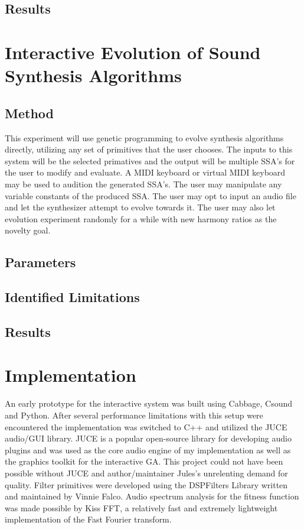 \documentclass[12pt]{article}
\begin{document}
\subsection{Results}

\section{Interactive Evolution of Sound Synthesis Algorithms}
\subsection{Method}
This experiment will use genetic programming to evolve synthesis algorithms directly, utilizing any set of primitives that the user chooses. The inputs to this system will be the selected primatives and the output will be multiple SSA's for the user to modify and evaluate. A MIDI keyboard or virtual MIDI keyboard may be used to audition the generated SSA's. The user may manipulate any variable constants of the produced SSA. The user may opt to input an audio file and let the synthesizer attempt to evolve towards it. The user may also let evolution experiment randomly for a while with new harmony ratios as the novelty goal.
\subsection{Parameters}
\subsection{Identified Limitations}
\subsection{Results}

\section{Implementation}
An early prototype for the interactive system was built using Cabbage, Csound and Python. After several performance limitations with this setup were encountered the implementation was switched to C++ and utilized the JUCE audio/GUI library. JUCE is a popular open-source library for developing audio plugins and was used as the core audio engine of my implementation as well as the graphics toolkit for the interactive GA. This project could not have been possible without JUCE and author/maintainer Jules's unrelenting demand for quality. Filter primitives were developed using the DSPFilters Library written and maintained by Vinnie Falco. Audio spectrum analysis for the fitness function was made possible by Kiss FFT, a relatively fast and extremely lightweight implementation of the Fast Fourier transform.
	
\end{document}

